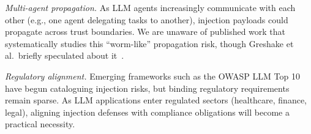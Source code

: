 \emph{Multi-agent propagation.} As LLM agents increasingly communicate with each other (e.g., one agent delegating tasks to another), injection payloads could propagate across trust boundaries. We are unaware of published work that systematically studies this ``worm-like'' propagation risk, though Greshake et al.\ briefly speculated about it~\cite{greshake2023indirect}.

\emph{Regulatory alignment.} Emerging frameworks such as the OWASP LLM Top 10~\cite{owasp2025llm} have begun cataloguing injection risks, but binding regulatory requirements remain sparse. As LLM applications enter regulated sectors (healthcare, finance, legal), aligning injection defenses with compliance obligations will become a practical necessity.
